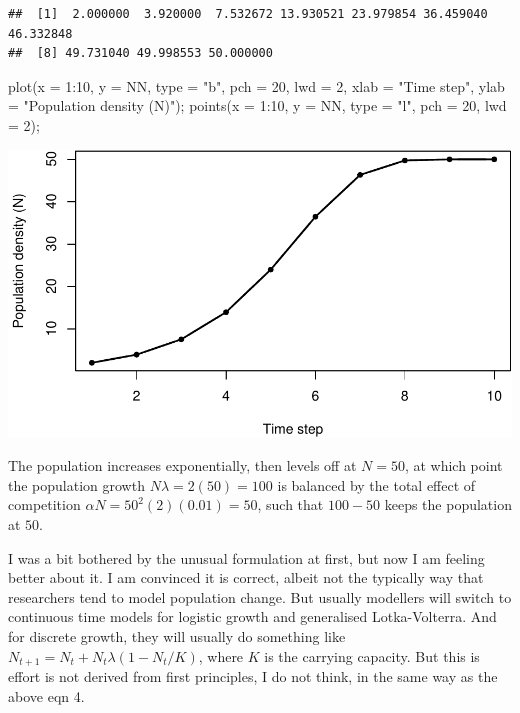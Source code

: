 \documentclass[
]{article}
\newenvironment{Shaded}{\begin{snugshade}}{\end{snugshade}}
\newcommand{\AttributeTok}[1]{\textcolor[rgb]{0.77,0.63,0.00}{#1}}
\newcommand{\DecValTok}[1]{\textcolor[rgb]{0.00,0.00,0.81}{#1}}
\newcommand{\FunctionTok}[1]{\textcolor[rgb]{0.00,0.00,0.00}{#1}}
\newcommand{\NormalTok}[1]{#1}
\newcommand{\SpecialCharTok}[1]{\textcolor[rgb]{0.00,0.00,0.00}{#1}}
\newcommand{\StringTok}[1]{\textcolor[rgb]{0.31,0.60,0.02}{#1}}
\begin{document}
\begin{verbatim}
##  [1]  2.000000  3.920000  7.532672 13.930521 23.979854 36.459040 46.332848
##  [8] 49.731040 49.998553 50.000000
\end{verbatim}

\begin{Shaded}
\begin{Highlighting}[]
\FunctionTok{plot}\NormalTok{(}\AttributeTok{x =} \DecValTok{1}\SpecialCharTok{:}\DecValTok{10}\NormalTok{, }\AttributeTok{y =}\NormalTok{ NN, }\AttributeTok{type =} \StringTok{"b"}\NormalTok{, }\AttributeTok{pch =} \DecValTok{20}\NormalTok{, }\AttributeTok{lwd =} \DecValTok{2}\NormalTok{,}
     \AttributeTok{xlab =} \StringTok{"Time step"}\NormalTok{,}
     \AttributeTok{ylab =} \StringTok{"Population density (N)"}\NormalTok{);}
\FunctionTok{points}\NormalTok{(}\AttributeTok{x =} \DecValTok{1}\SpecialCharTok{:}\DecValTok{10}\NormalTok{, }\AttributeTok{y =}\NormalTok{ NN, }\AttributeTok{type =} \StringTok{"l"}\NormalTok{, }\AttributeTok{pch =} \DecValTok{20}\NormalTok{, }\AttributeTok{lwd =} \DecValTok{2}\NormalTok{);}
\end{Highlighting}
\end{Shaded}

\includegraphics{foundations_of_community_ecology_files/figure-latex/unnamed-chunk-1-1.pdf}

The population increases exponentially, then levels off at \(N = 50\),
at which point the population growth \(N\lambda = 2(50) = 100\) is
balanced by the total effect of competition
\(\alpha N = 50^{2}(2)(0.01) = 50\), such that \(100 - 50\) keeps the
population at \(50\).

I was a bit bothered by the unusual formulation at first, but now I am
feeling better about it. I am convinced it is correct, albeit not the
typically way that researchers tend to model population change. But
usually modellers will switch to continuous time models for logistic
growth and generalised Lotka-Volterra. And for discrete growth, they
will usually do something like
\(N_{t+1} = N_{t} + N_{t}\lambda(1 - N_{t}/K)\), where \(K\) is the
carrying capacity. But this is effort is not derived from first
principles, I do not think, in the same way as the above eqn 4.
\end{document}
